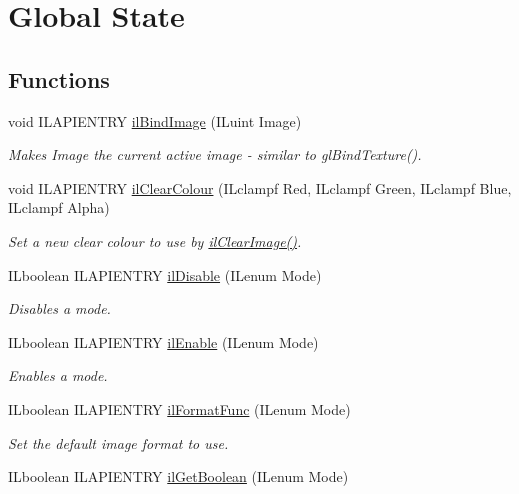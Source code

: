 \hypertarget{group__state}{\section{Global State}
\label{group__state}
}
\subsection*{Functions}
\begin{DoxyCompactItemize}
\item 
void I\+L\+A\+P\+I\+E\+N\+T\+R\+Y \hyperlink{group__state_ga1ee59d3004b3fdd25e91da8e41708035}{il\+Bind\+Image} (I\+Luint Image)
\begin{DoxyCompactList}\small\item\em Makes Image the current active image -\/ similar to gl\+Bind\+Texture(). \end{DoxyCompactList}\item 
\hypertarget{group__state_gaca1dc7f7b8e61eb134060c9c8a8b72f2}{void I\+L\+A\+P\+I\+E\+N\+T\+R\+Y \hyperlink{group__state_gaca1dc7f7b8e61eb134060c9c8a8b72f2}{il\+Clear\+Colour} (I\+Lclampf Red, I\+Lclampf Green, I\+Lclampf Blue, I\+Lclampf Alpha)}\label{group__state_gaca1dc7f7b8e61eb134060c9c8a8b72f2}

\begin{DoxyCompactList}\small\item\em Set a new clear colour to use by \hyperlink{group__image__manip_gae48d76d54f6f00fe54b304c29224653f}{il\+Clear\+Image()}. \end{DoxyCompactList}\item 
I\+Lboolean I\+L\+A\+P\+I\+E\+N\+T\+R\+Y \hyperlink{group__state_ga4b5f72e2b4f6b197efed3a64646a6651}{il\+Disable} (I\+Lenum Mode)
\begin{DoxyCompactList}\small\item\em Disables a mode. \end{DoxyCompactList}\item 
I\+Lboolean I\+L\+A\+P\+I\+E\+N\+T\+R\+Y \hyperlink{group__state_gafa976322d840e3ffa8e0076ecff51b2b}{il\+Enable} (I\+Lenum Mode)
\begin{DoxyCompactList}\small\item\em Enables a mode. \end{DoxyCompactList}\item 
I\+Lboolean I\+L\+A\+P\+I\+E\+N\+T\+R\+Y \hyperlink{group__state_gacc97a458c5ba4562e32f0e8c446b3106}{il\+Format\+Func} (I\+Lenum Mode)
\begin{DoxyCompactList}\small\item\em Set the default image format to use. \end{DoxyCompactList}\item 
\hypertarget{group__state_ga57d539fb2bdaacd8c6eec5d7e732e6e3}{I\+Lboolean I\+L\+A\+P\+I\+E\+N\+T\+R\+Y \hyperlink{group__state_ga57d539fb2bdaacd8c6eec5d7e732e6e3}{il\+Get\+Boolean} (I\+Lenum Mode)}\label{group__state_ga57d539fb2bdaacd8c6eec5d7e732e6e3}


\end{DoxyCompactItemize}
